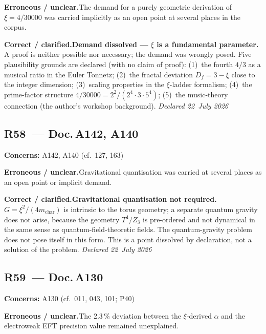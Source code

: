\smallskip\noindent\textbf{Erroneous / unclear.}\quad The demand for a purely geometric derivation of $\xi=4/30000$ was carried implicitly as an open point at several places in the corpus.


\smallskip\noindent\textbf{Correct / clarified.}\quad \textbf{Demand dissolved --- $\xi$ is a fundamental parameter.} A proof is neither possible nor necessary; the demand was wrongly posed. Five plausibility grounds are declared (with no claim of proof): (1)~the fourth $4/3$ as a musical ratio in the Euler Tonnetz; (2)~the fractal deviation $D_f=3-\xi$ close to the integer dimension; (3)~scaling properties in the $\xi$-ladder formalism; (4)~the prime-factor structure $4/30000 = 2^2/(2^4\cdot 3\cdot 5^4)$; (5)~the music-theory connection (the author's workshop background). \emph{Declared 22~July 2026}


\medskip


\subsection*{R58~--- Doc.\,A142, A140}

\noindent\textbf{Concerns:} A142, A140 (cf.\ 127, 163)


\smallskip\noindent\textbf{Erroneous / unclear.}\quad Gravitational quantisation was carried at several places as an open point or implicit demand.


\smallskip\noindent\textbf{Correct / clarified.}\quad \textbf{Gravitational quantisation not required.} $G=\xi^2/(4m_\text{char})$ is intrinsic to the torus geometry; a separate quantum gravity does not arise, because the geometry $T^4/Z_3$ is pre-ordered and not dynamical in the same sense as quantum-field-theoretic fields. The quantum-gravity problem does not pose itself in this form. This is a point dissolved by declaration, not a solution of the problem. \emph{Declared 22~July 2026}


\medskip


\subsection*{R59~--- Doc.\,A130}

\noindent\textbf{Concerns:} A130 (cf.\ 011, 043, 101; P40)


\smallskip\noindent\textbf{Erroneous / unclear.}\quad The 2.3\,\% deviation between the $\xi$-derived $\alpha$ and the electroweak EFT precision value remained unexplained.


